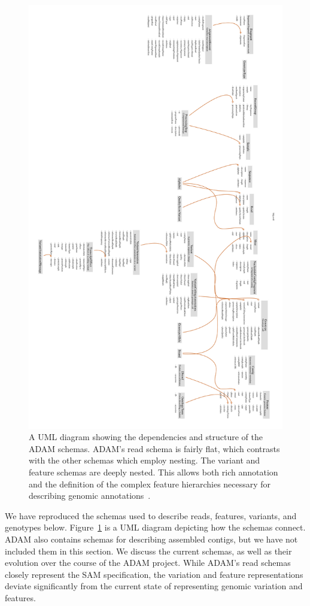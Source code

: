 \documentclass[phd]{ucbthesis}
\begin{document}
\begin{figure}[h]
\begin{center}
\includegraphics[width=0.65\linewidth]{graphs/bdg.pdf}
\end{center}
\caption{A UML diagram showing the dependencies and structure of the ADAM
  schemas. ADAM's read schema is fairly flat, which contrasts with the other
  schemas which employ nesting. The variant and feature schemas are deeply
  nested. This allows both rich annotation and the definition of the complex
  feature hierarchies necessary for describing genomic
  annotations~\cite{eilbeck05}.}
\label{fig:schemas}
\end{figure}

We have reproduced the schemas used to describe reads, features, variants, and
genotypes below. Figure~\ref{fig:schemas} is a UML diagram depicting how the
schemas connect. {ADAM} also contains schemas for describing assembled
contigs, but we have not included them in this section. We discuss the current
schemas, as well as their evolution over the course of the {ADAM}
project. While {ADAM}'s read schemas closely represent the {SAM}
specification, the variation and feature representations deviate significantly
from the current state of representing genomic variation and features.
\end{document}
